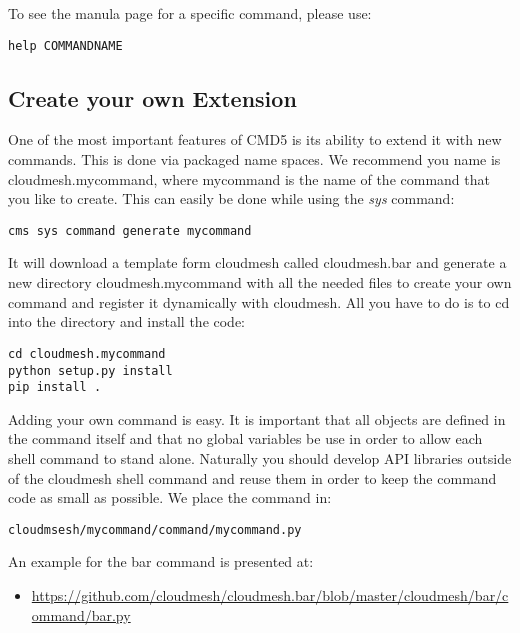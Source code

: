 To see the manula page for a specific command, please use:

\begin{verbatim}
help COMMANDNAME
\end{verbatim}

\subsection{Create your own Extension}\label{create-your-own-extension}

One of the most important features of CMD5 is its ability to extend it
with new commands. This is done via packaged name spaces. We recommend
you name is cloudmesh.mycommand, where mycommand is the name of the
command that you like to create. This can easily be done while using the
\emph{sys} command:

\begin{verbatim}
cms sys command generate mycommand
\end{verbatim}

It will download a template form cloudmesh called cloudmesh.bar and
generate a new directory cloudmesh.mycommand with all the needed files
to create your own command and register it dynamically with cloudmesh.
All you have to do is to cd into the directory and install the code:

\begin{verbatim}
cd cloudmesh.mycommand
python setup.py install
pip install .
\end{verbatim}

Adding your own command is easy. It is important that all objects are
defined in the command itself and that no global variables be use in
order to allow each shell command to stand alone. Naturally you should
develop API libraries outside of the cloudmesh shell command and reuse
them in order to keep the command code as small as possible. We place
the command in:

\begin{verbatim}
cloudmsesh/mycommand/command/mycommand.py
\end{verbatim}

An example for the bar command is presented at:

\begin{itemize}
\tightlist
\item
  \url{https://github.com/cloudmesh/cloudmesh.bar/blob/master/cloudmesh/bar/command/bar.py}
\end{itemize}

